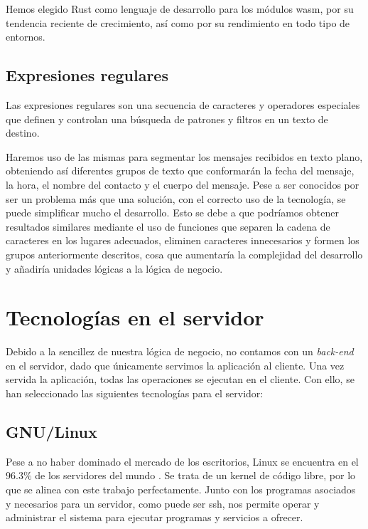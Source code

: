 Hemos elegido Rust como lenguaje de desarrollo para los módulos \acrfull{wasm}, por su tendencia reciente de crecimiento, así como por su rendimiento en todo tipo de entornos.

\subsection{Expresiones regulares}
\label{tec_hab:regex}

Las expresiones regulares son una secuencia de caracteres y operadores especiales que definen y controlan una búsqueda de patrones y filtros en un texto de destino.

Haremos uso de las mismas para segmentar los mensajes recibidos en texto plano, obteniendo así diferentes grupos de texto que conformarán la fecha del mensaje, la hora, el nombre del contacto y el cuerpo del mensaje. Pese a ser conocidos por ser un problema más que una solución, con el correcto uso de la tecnología, se puede simplificar mucho el desarrollo. Esto se debe a que podríamos obtener resultados similares mediante el uso de funciones que separen la cadena de caracteres en los lugares adecuados, eliminen caracteres innecesarios y formen los grupos anteriormente descritos, cosa que aumentaría la complejidad del desarrollo y añadiría unidades lógicas a la lógica de negocio.


\section{Tecnologías en el servidor}
\label{tec_hab:server}

Debido a la sencillez de nuestra lógica de negocio, no contamos con un \textit{back-end} en el servidor, dado que únicamente servimos la aplicación al cliente. Una vez servida la aplicación, todas las operaciones se ejecutan en el cliente. Con ello, se han seleccionado las siguientes tecnologías para el servidor:



\subsection{GNU/Linux}
\label{tec_hab:linux}

Pese a no haber dominado el mercado de los escritorios, Linux se encuentra en el $96.3\%$ de los servidores del mundo \cite{linuxMarketShare}. Se trata de un kernel de código libre, por lo que se alinea con este trabajo perfectamente. Junto con los programas asociados y necesarios para un servidor, como puede ser \acrshort{ssh}, nos permite operar y administrar el sistema para ejecutar programas y servicios a ofrecer.


